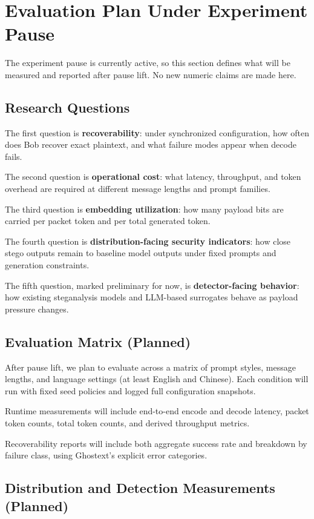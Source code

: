 \section{Evaluation Plan Under Experiment Pause}

The experiment pause is currently active, so this section defines what will be measured and reported after pause lift. No new numeric claims are made here.

\subsection{Research Questions}

The first question is \textbf{recoverability}: under synchronized configuration, how often does Bob recover exact plaintext, and what failure modes appear when decode fails.

The second question is \textbf{operational cost}: what latency, throughput, and token overhead are required at different message lengths and prompt families.

The third question is \textbf{embedding utilization}: how many payload bits are carried per packet token and per total generated token.

The fourth question is \textbf{distribution-facing security indicators}: how close stego outputs remain to baseline model outputs under fixed prompts and generation constraints.

The fifth question, marked preliminary for now, is \textbf{detector-facing behavior}: how existing steganalysis models and LLM-based surrogates behave as payload pressure changes.

\subsection{Evaluation Matrix (Planned)}

After pause lift, we plan to evaluate across a matrix of prompt styles, message lengths, and language settings (at least English and Chinese). Each condition will run with fixed seed policies and logged full configuration snapshots.

Runtime measurements will include end-to-end encode and decode latency, packet token counts, total token counts, and derived throughput metrics.

Recoverability reports will include both aggregate success rate and breakdown by failure class, using Ghostext's explicit error categories.

\subsection{Distribution and Detection Measurements (Planned)}

